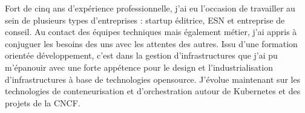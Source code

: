 

\begin{cvparagraph}

Fort de cinq ans d’expérience professionnelle, j'ai eu l’occasion de travailler au sein de plusieurs types d’entreprises : startup éditrice, ESN et entreprise de conseil. Au contact des équipes techniques mais également métier, j'ai appris à conjuguer les besoins des uns avec les attentes des autres.
Issu d'une formation orientée développement, c'est dans la gestion d'infrastructures que j'ai pu m'épanouir avec une forte appétence pour le design et l'industrialisation d'infrastructures à base de technologies opensource. J'évolue maintenant sur les technologies de conteneurisation et d'orchestration autour de Kubernetes et des projets de la CNCF. 
\end{cvparagraph}
